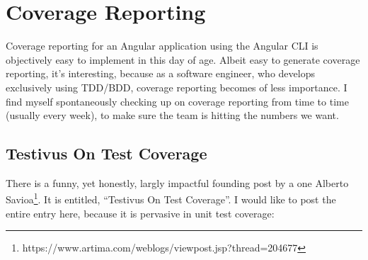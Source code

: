 \maketitle{}
\section{ Coverage Reporting }

Coverage reporting for an Angular application using the Angular CLI is
objectively easy to implement in this day of age. Albeit easy to generate
coverage reporting, it's interesting, because as a software engineer, who
develops exclusively using TDD/BDD, coverage reporting becomes of less
importance. I find myself spontaneously checking up on coverage reporting from
time to time (usually every week), to make sure the team is hitting the numbers
we want.

\subsection{Testivus On Test Coverage}
There is a funny, yet honestly, largly impactful founding post by a one
Alberto Savioa\footnote{https://www.artima.com/weblogs/viewpost.jsp?thread=204677}.
It is entitled, ``Testivus On Test Coverage''. I would like to post the entire
entry here, because it is pervasive in unit test coverage:

